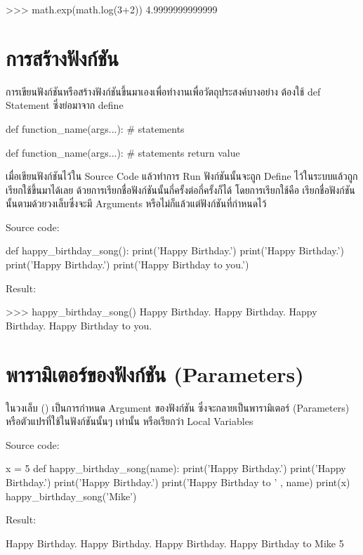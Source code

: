 \begin{pycode}
>>> math.exp(math.log(3+2))
4.9999999999999
\end{pycode}

\section{การสร้างฟังก์ชัน}

การเขียนฟังก์ชันหรือสร้างฟังก์ชันขึ้นมาเองเพื่อทำงานเพื่อวัตถุประสงค์บางอย่าง ต้องใช้ def Statement ซึ่งย่อมาจาก define 

\begin{pycode}
def function_name(args...):
    # statements

def function_name(args...):
    # statements
    return value
\end{pycode}

เมื่อเขียนฟังก์ชันไว้ใน Source Code แล้วทำการ Run ฟังก์ชันนั้นจะถูก Define ไว้ในระบบแล้วถูกเรียกใช้ขึ้นมาได้เลย ด้วยการเรียกชื่อฟังก์ชันนั้นกี่ครั้งต่อกี่ครั้งก็ได้ โดยการเรียกใช้คือ เรียกชื่อฟังก์ชันนั้นตามด้วยวงเล็บซึ่งจะมี Arguments หรือไม่ก็แล้วแต่ฟังก์ชันที่กำหนดไว้

Source code:
\begin{pycode}
def happy_birthday_song():
    print('Happy Birthday.')
    print('Happy Birthday.')
    print('Happy Birthday.')
    print('Happy Birthday to you.')
\end{pycode}

Result:
\begin{pycode}
>>>  happy_birthday_song()
Happy Birthday.
Happy Birthday.
Happy Birthday.
Happy Birthday to you.
\end{pycode}


\section{พารามิเตอร์ของฟังก์ชัน (Parameters)}

ในวงเล็บ () เป็นการกำหนด Argument ของฟังก์ชัน ซึ่งจะกลายเป็นพารามิเตอร์ (Parameters) หรือตัวแปรที่ใช้ในฟังก์ชันนั้นๆ เท่านั้น หรือเรียกว่า Local Variables 

Source code:
\begin{pycode}
x = 5
def happy_birthday_song(name):
    print('Happy Birthday.')
    print('Happy Birthday.')
    print('Happy Birthday.')
    print('Happy Birthday to ' , name)
    print(x)
happy_birthday_song('Mike')
\end{pycode}

Result:
\begin{pycode}
Happy Birthday.
Happy Birthday.
Happy Birthday.
Happy Birthday to Mike
5
\end{pycode}


